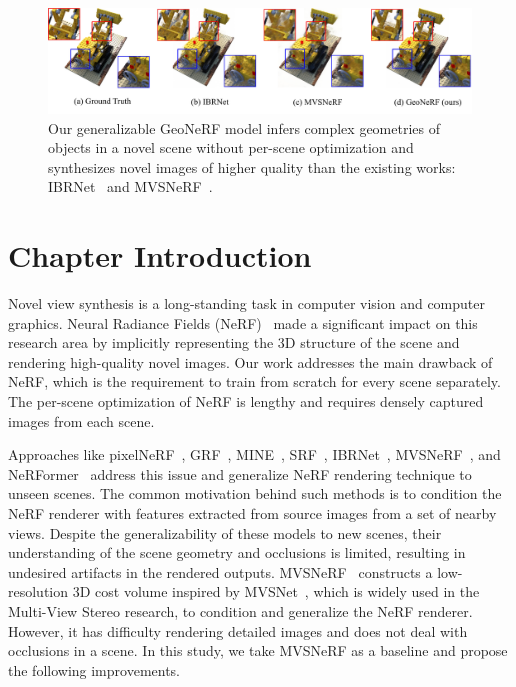 \begin{figure}[t]
    \begin{center}
        \includegraphics[width=1.0\linewidth]{images/chapter3/figures/intro.jpg}
    \end{center}
   \caption{Our generalizable GeoNeRF model infers complex geometries of objects in a novel scene without per-scene optimization and synthesizes novel images of higher quality than the existing works: IBRNet~\citep{wang2021ibrnet} and MVSNeRF~\citep{chen2021mvsnerf}.}
\end{figure}

\section{Chapter Introduction}

Novel view synthesis is a long-standing task in computer vision and computer graphics. Neural Radiance Fields (NeRF)~\citep{mildenhall2020nerf} made a significant impact on this research area by implicitly representing the 3D structure of the scene and rendering high-quality novel images. Our work addresses the main drawback of NeRF, which is the requirement to train from scratch for every scene separately. The per-scene optimization of NeRF is lengthy and requires densely captured images from each scene.

Approaches like pixelNeRF~\citep{yu2021pixelnerf}, GRF~\citep{trevithick2021grf}, MINE~\citep{li2021mine}, SRF~\citep{chibane2021stereo}, IBRNet~\citep{wang2021ibrnet}, MVSNeRF~\citep{chen2021mvsnerf}, and NeRFormer~\citep{reizenstein2021common} address this issue and generalize NeRF rendering technique to unseen scenes. The common motivation behind such methods is to condition the NeRF renderer with features extracted from source images from a set of nearby views. Despite the generalizability of these models to new scenes, their understanding of the scene geometry and occlusions is limited, resulting in undesired artifacts in the rendered outputs. MVSNeRF~\citep{chen2021mvsnerf} constructs a low-resolution 3D cost volume inspired by MVSNet~\citep{yao2018mvsnet}, which is widely used in the Multi-View Stereo research, to condition and generalize the NeRF renderer. However, it has difficulty rendering detailed images and does not deal with occlusions in a scene. In this study, we take MVSNeRF as a baseline and propose the following improvements.

